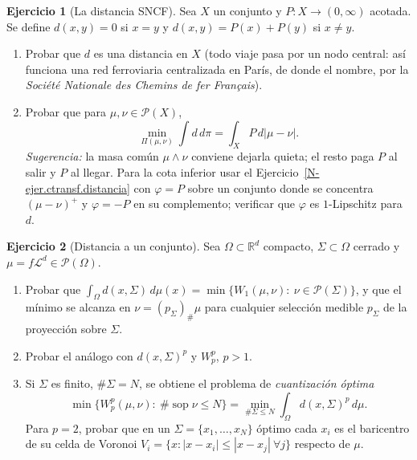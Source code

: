 \documentclass[11pt,a4paper]{amsart}
\newcounter{chapter}
\def\sop{\operatorname {\mathrm{sop}}}
\newcommand{\R}{{\mathbb R}}
\newcommand{\LL}{{\mathcal L}}
\theoremstyle{remark}
\theoremstyle{definition}
\newtheorem{ejercicio}{Ejercicio}[chapter]
\numberwithin{subsection}{section}
\numberwithin{equation}{section}
\begin{document}
\begin{ejercicio}[La distancia SNCF]\label{ejer.KR.SNCF}
Sea $X$ un conjunto y $P\colon X\to(0,\infty)$ acotada. Se define
$d(x,y)=0$ si $x=y$ y $d(x,y)=P(x)+P(y)$ si $x\ne y$.
\begin{enumerate}[label=(\alph*)]
\item Probar que $d$ es una distancia en $X$ (todo viaje pasa por un nodo
central: así funciona una red ferroviaria centralizada en París, de donde
el nombre, por la \emph{Société Nationale des Chemins de fer Français}).
\item Probar que para $\mu,\nu\in\mathcal P(X)$,
\[
\min_{\Pi(\mu,\nu)}\int d\,d\pi=\int_XP\,d|\mu-\nu|.
\]
\emph{Sugerencia:} la masa común $\mu\wedge\nu$ conviene dejarla quieta; el
resto paga $P$ al salir y $P$ al llegar. Para la cota inferior usar el
Ejercicio~\ref{N-ejer.ctransf.distancia} con $\varphi=P$ sobre un conjunto
donde se concentra $(\mu-\nu)^+$ y $\varphi=-P$ en su complemento; verificar
que $\varphi$ es $1$-Lipschitz para $d$.
\end{enumerate}
\end{ejercicio}

\begin{ejercicio}[Distancia a un conjunto]\label{ejer.Wp.distancia.conjunto}
Sea $\Omega\subset\R^d$ compacto, $\Sigma\subset\Omega$ cerrado y
$\mu=f\LL^d\in\mathcal P(\Omega)$.
\begin{enumerate}[label=(\alph*)]
\item Probar que
$\int_\Omega d(x,\Sigma)\,d\mu(x)=\min\{W_1(\mu,\nu):\ \nu\in\mathcal P(\Sigma)\}$,
y que el mínimo se alcanza en $\nu=(p_\Sigma)_\#\mu$ para cualquier
selección medible $p_\Sigma$ de la proyección sobre $\Sigma$.
\item Probar el análogo con $d(x,\Sigma)^p$ y $W_p^p$, $p>1$.
\item Si $\Sigma$ es finito, $\#\Sigma=N$, se obtiene el problema de
\emph{cuantización óptima}
\[
\min\{W_p^p(\mu,\nu):\ \#\sop\nu\le N\}=\min_{\#\Sigma\le N}\int_\Omega d(x,\Sigma)^p\,d\mu .
\]
Para $p=2$, probar que en un $\Sigma=\{x_1,\dots,x_N\}$ óptimo cada $x_i$ es
el baricentro de su celda de Voronoi $V_i=\{x:|x-x_i|\le|x-x_j|\ \forall j\}$
respecto de $\mu$.
\end{enumerate}
\end{ejercicio}
\end{document}
